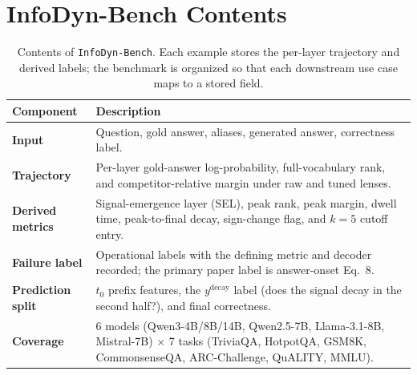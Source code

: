\documentclass{article} %
\begin{document}
\section{InfoDyn-Bench Contents}
\label{app:bench}

\begin{table}[h]
\centering
\caption{Contents of \texttt{InfoDyn-Bench}. Each example stores the per-layer trajectory and derived labels; the benchmark is organized so that each downstream use case maps to a stored field.}
\label{tab:benchmark}
\small
\begin{tabular}{lp{8.6cm}}
\toprule
\textbf{Component} & \textbf{Description} \\
\midrule
\textbf{Input} & Question, gold answer, aliases, generated answer, correctness label. \\
\textbf{Trajectory} & Per-layer gold-answer log-probability, full-vocabulary rank, and competitor-relative margin under raw and tuned lenses. \\
\textbf{Derived metrics} & Signal-emergence layer (SEL), peak rank, peak margin, dwell time, peak-to-final decay, sign-change flag, and $k=5$ cutoff entry. \\
\textbf{Failure label} & Operational labels with the defining metric and decoder recorded; the primary paper label is answer-onset Eq.~8. \\
\textbf{Prediction split} & $t_0$ prefix features, the $y^{\mathrm{decay}}$ label (does the signal decay in the second half?), and final correctness. \\
\textbf{Coverage} & 6 models (Qwen3-4B/8B/14B, Qwen2.5-7B, Llama-3.1-8B, Mistral-7B) $\times$ 7 tasks (TriviaQA, HotpotQA, GSM8K, CommonsenseQA, ARC-Challenge, QuALITY, MMLU). \\
\bottomrule
\end{tabular}
\end{table}




\end{document}
